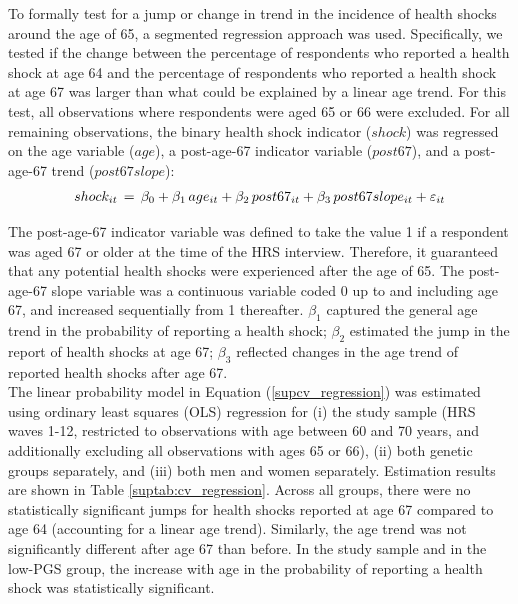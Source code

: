 To formally test for a jump or change in trend in the incidence of health shocks around the age of 65, a segmented regression approach was used. Specifically, we tested if the change between the percentage of respondents who reported a health shock at age 64 and the percentage of respondents who reported a health shock at age 67 was larger than what could be explained by a linear age trend. For this test, all observations where respondents were aged 65 or 66 were excluded. For all remaining observations, the binary health shock indicator ($shock$) was regressed on the age variable ($age$), a post-age-67 indicator variable ($post67$), and a post-age-67 trend ($post67slope$):
\begin{align} \label{supcv_regression}
shock_{it} \thinspace = \thinspace \beta_0 + \beta_1 \thinspace age_{it} + \beta_2 \thinspace post67_{it} + \beta_3 \thinspace post67slope_{it} + \varepsilon_{it}
\end{align}

The post-age-67 indicator variable was defined to take the value 1 if a respondent was aged 67 or older at the time of the HRS interview. Therefore, it guaranteed that any potential health shocks were experienced after the age of 65. The post-age-67 slope variable was a continuous variable coded 0 up to and including age 67, and increased sequentially from 1 thereafter. $\beta_1$ captured the general age trend in the probability of reporting a health shock; $\beta_2$ estimated the jump in the report of health shocks at age 67; $\beta_3$ reflected changes in the age trend of reported health shocks after age 67.\\


The linear probability model in Equation (\ref{supcv_regression}) was estimated using ordinary least squares (OLS) regression for (i) the study sample (HRS waves 1-12, restricted to observations with age between 60 and 70 years, and additionally excluding all observations with ages 65 or 66), (ii) both genetic groups separately, and (iii) both men and women separately. Estimation results are shown in Table \ref{suptab:cv_regression}. Across all groups, there were no statistically significant jumps for health shocks reported at age 67 compared to age 64 (accounting for a linear age trend). Similarly, the age trend was not significantly different after age 67 than before. In the study sample and in the low-PGS group, the increase with age in the probability of reporting a health shock was statistically significant.



